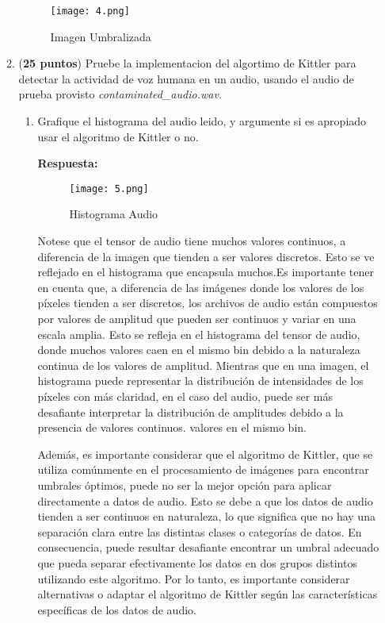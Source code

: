 \documentclass[spanish]{article}
\begin{document}
\begin{enumerate}
\begin{enumerate}
\begin{enumerate}
\end{enumerate}
\begin{figure}[h]
    \centering
    \texttt{[image: 4.png]}
    \caption{Imagen Umbralizada}
    \label{fig:enter-label}
\end{figure}
\newpage
\item (\textbf{25 puntos}) Pruebe la implementacion del algortimo de Kittler
para detectar la actividad de voz humana en un audio, usando el audio
de prueba provisto \emph{contaminated\_audio.wav.}
\begin{enumerate}
\item Grafique el histograma del audio leido, y argumente si es apropiado
usar el algoritmo de Kittler o no.
\vspace{5px}

\par \textbf{Respuesta:}
\begin{figure}[h]
    \centering
    \texttt{[image: 5.png]}
    \caption{Histograma Audio}
    \label{fig:enter-label}
\end{figure}
\vspace{5px}

\par Notese que el tensor de audio tiene muchos valores continuos, a diferencia de la imagen que tienden a ser valores discretos. Esto se ve reflejado en el histograma que encapsula muchos.Es importante tener en cuenta que, a diferencia de las imágenes donde los valores de los píxeles tienden a ser discretos, los archivos de audio están compuestos por valores de amplitud que pueden ser continuos y variar en una escala amplia. Esto se refleja en el histograma del tensor de audio, donde muchos valores caen en el mismo bin debido a la naturaleza continua de los valores de amplitud. Mientras que en una imagen, el histograma puede representar la distribución de intensidades de los píxeles con más claridad, en el caso del audio, puede ser más desafiante interpretar la distribución de amplitudes debido a la presencia de valores continuos. valores en el mismo bin.
\vspace{5px}

\par Además, es importante considerar que el algoritmo de Kittler, que se utiliza comúnmente en el procesamiento de imágenes para encontrar umbrales óptimos, puede no ser la mejor opción para aplicar directamente a datos de audio. Esto se debe a que los datos de audio tienden a ser continuos en naturaleza, lo que significa que no hay una separación clara entre las distintas clases o categorías de datos. En consecuencia, puede resultar desafiante encontrar un umbral adecuado que pueda separar efectivamente los datos en dos grupos distintos utilizando este algoritmo. Por lo tanto, es importante considerar alternativas o adaptar el algoritmo de Kittler según las características específicas de los datos de audio.
\vspace{5px}


\end{enumerate}
\end{enumerate}
\end{enumerate}
\end{document}
